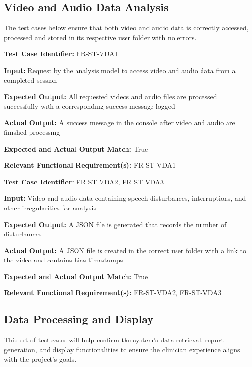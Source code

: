 \documentclass[12pt, titlepage]{article}
\begin{document}
\newpage{}

\subsection{Video and Audio Data Analysis}
\hspace{2em}The test cases below ensure that both video and audio data is correctly accessed, processed and stored 
in its respective user folder with no errors.

\begin{mdframed}[linewidth=0.5mm] \par
  \textbf{Test Case Identifier:} FR-ST-VDA1 \par
  \textbf{Input:} Request by the analysis model to access video and audio data from a completed session \par
  \textbf{Expected Output:} All requested videos and audio files are processed successfully with a corresponding success message logged \par
  \textbf{Actual Output:} A success message in the console after video and audio are finished processing \par
  \textbf{Expected and Actual Output Match:} True \par
  \textbf{Relevant Functional Requirement(s):} FR-ST-VDA1
\end{mdframed}

\begin{mdframed}[linewidth=0.5mm] \par
  \textbf{Test Case Identifier:} FR-ST-VDA2, FR-ST-VDA3 \par
  \textbf{Input:} Video and audio data containing speech disturbances, interruptions, and other irregularities for analysis \par
  \textbf{Expected Output:} A JSON file is generated that records the number of disturbances \par
  \textbf{Actual Output:} A JSON file is created in the correct user folder with a link to the video and contains bias timestamps\par
  \textbf{Expected and Actual Output Match:} True \par
  \textbf{Relevant Functional Requirement(s):} FR-ST-VDA2, FR-ST-VDA3
\end{mdframed}

\newpage{}

\subsection{Data Processing and Display}
\hspace{2em}This set of test cases will help confirm the system's data retrieval, report generation, 
and display functionalities to ensure the clinician experience aligns with the project’s goals.
\end{document}
